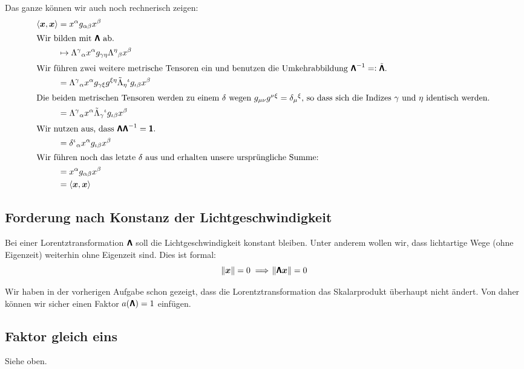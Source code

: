 Das ganze können wir auch noch rechnerisch zeigen:
\begin{align*}
	\inner{\vec x}{\vec x}
	&= x^\alpha g_{\alpha \beta} x^\beta \\
	\intertext{Wir bilden mit $\tens \Lambda$ ab.}
	&\mapsto \Lambda^\gamma{}_\alpha x^\alpha g_{\gamma \eta} \Lambda^\eta{}_\beta x^\beta \\
	\intertext{%
		Wir führen zwei weitere metrische Tensoren ein und benutzen die
		Umkehrabbildung $\tens \Lambda^{-1} =: \tilde{\tens \Lambda}$.
	}
	&= \Lambda^\gamma{}_\alpha x^\alpha g_{\gamma \xi} g^{\xi \eta} \tilde\Lambda_\eta{}^\iota g_{\iota\beta} x^\beta \\
	\intertext{%
		Die beiden metrischen Tensoren werden zu einem $\delta$ wegen
		$g_{\mu\nu} g^{\nu\xi} = \delta_\mu{}^\xi$, so dass sich die Indizes
		$\gamma$ und $\eta$ identisch werden.
	}
	&= \Lambda^\gamma{}_\alpha x^\alpha \tilde\Lambda_\gamma{}^\iota g_{\iota\beta} x^\beta \\
	\intertext{%
		Wir nutzen aus, dass $\tens \Lambda \tens \Lambda^{-1} = \tens 1$.
	}
	&= \delta^\iota{}_\alpha x^\alpha g_{\iota\beta} x^\beta \\
	\intertext{%
		Wir führen noch das letzte $\delta$ aus und erhalten unsere
		ursprüngliche Summe:
	}
	&= x^\alpha g_{\alpha\beta} x^\beta \\
	&= \inner{\vec x}{\vec x}
\end{align*}

\subsection{Forderung nach Konstanz der Lichtgeschwindigkeit}

Bei einer Lorentztransformation $\boldsymbol{\mathsf{\Lambda}}$ soll die Lichtgeschwindigkeit
konstant bleiben. Unter anderem wollen wir, dass lichtartige Wege (ohne
Eigenzeit) weiterhin ohne Eigenzeit sind. Dies ist formal:
\[
	\norm{\boldsymbol{x}} = 0 \implies \norm{\boldsymbol{\mathsf{\Lambda}} \boldsymbol{x}} = 0
\]

Wir haben in der vorherigen Aufgabe schon gezeigt, dass die
Lorentztransformation das Skalarprodukt überhaupt nicht ändert. Von daher
können wir sicher einen Faktor $a(\boldsymbol{\mathsf{\Lambda}}) = 1$ einfügen.

\subsection{Faktor gleich eins}

Siehe oben.

